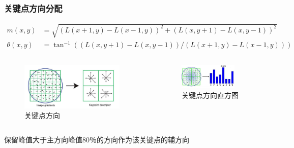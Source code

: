 \documentclass[presentation,aspectratio=1610]{beamer}
\begin{document}
\begin{frame}
	\frametitle{关键点方向分配}
	\begin{equation*} 
\begin{aligned} m(x, y) &=\sqrt{(L(x+1, y)-L(x-1, y))^{2}+(L(x, y+1)-L(x, y-1))^{2}} \\ \theta(x, y) &=\tan ^{-1}((L(x, y+1)-L(x, y-1)) /(L(x+1, y)-L(x-1, y))) \end{aligned}
\end{equation*}

	\begin{columns}
\begin{figure}[htbp!]
	\centering
	\includegraphics[width=0.9\textwidth]{img/diect.jpg}
	\caption{关键点方向}
\end{figure}
\begin{figure}[htbp!]
	\centering
	\includegraphics[width=0.9\textwidth]{img/main_diect.jpg}
	\caption{关键点方向直方图}
\end{figure}
	\end{columns} \pause
	保留峰值大于主方向峰值80％的方向作为该关键点的辅方向
\end{frame}
\end{document}
